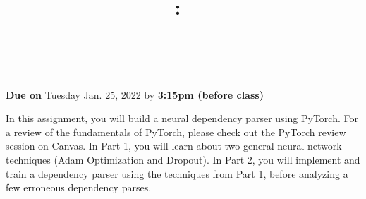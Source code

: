 \documentclass[answers]{exam}
\title{
    \vspace{-1in}
    \textmd{\textbf{\hmwkClass:\ \hmwkTitle} \\ \hmwkAuthorName}\\
}
\author{}
\date{}
\begin{document}
    \maketitle

    \begin{center}
        \large{\textbf{Due on} Tuesday Jan. 25, 2022 by \textbf{3:15pm (before class)}}
    \end{center}

    In this assignment, you will build a neural dependency parser using PyTorch. For a review of the fundamentals of PyTorch, please check out the PyTorch review session on Canvas. In Part 1, you will learn about two general neural network techniques (Adam Optimization and Dropout). In Part 2, you will implement and train a dependency parser using the techniques from Part 1, before analyzing a few erroneous dependency parses.
    \begin{questions}
        
        \newpage
        
    \end{questions}

    
\end{document}

